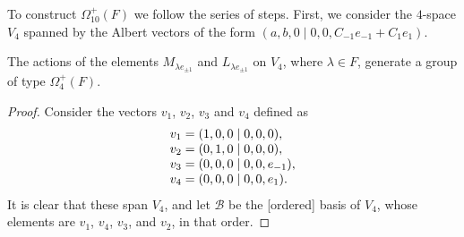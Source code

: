 To construct $\Omega_{10}^+(F)$ we follow the series of steps. First, we consider the
$4$-space $V_4$ spanned by the Albert vectors of the form 
\mbox{$(a,b,0\mid 0,0,C_{-1}e_{-1} + C_1 e_1)$}. 

\begin{lemma}
	\label{lemma:1_omega4}
	The actions of the elements $M_{\lambda e_{\pm 1}}$ and $L_{\lambda e_{\pm 1}}$
	on $V_4$, where $\lambda \in F$, generate a group of type $\Omega_4^+(F)$.
\end{lemma}

\begin{proof}
	Consider the vectors $v_1$, $v_2$, $v_3$ and $v_4$ defined as
	\begin{equation*}
		\begin{array}{r@{\;}c@{\;}l}
			v_1 & = & (1,0,0 \mid 0,0,0), \\
			v_2 & = & (0,1,0 \mid 0,0,0), \\
			v_3 & = & (0,0,0 \mid 0,0,e_{-1}), \\
			v_4 & = & (0,0,0 \mid 0,0,e_1).
		\end{array}
	\end{equation*}
	It is clear that these span $V_4$, and let $\mathcal{B}$ be 
	the [ordered] basis of $V_4$, whose
	elements are $v_1$, $v_4$, $v_3$, and $v_2$, in that order. 
	

\end{proof}
